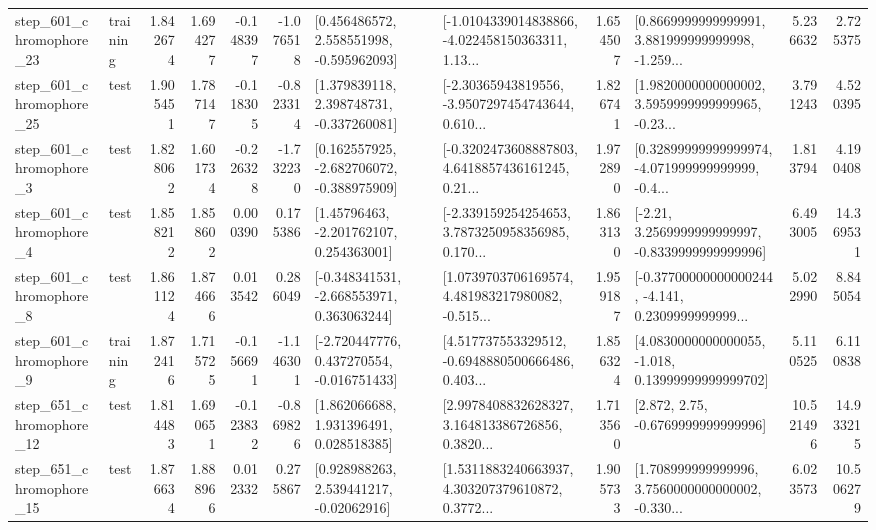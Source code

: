 \begin{tabular}{llrrrrllrlrr}
  step\_601\_chromophore\_23 &  training &      1.842674 &    1.694277 &     -0.148397 & -1.076518 &    [0.456486572, 2.558551998, -0.595962093] &  [-1.0104339014838866, -4.022458150363311, 1.13... &       1.654507 &  [0.8669999999999991, 3.881999999999998, -1.259... &            5.236632 &          2.725375 \\
  step\_601\_chromophore\_25 &      test &      1.905451 &    1.787147 &     -0.118305 & -0.823314 &    [1.379839118, 2.398748731, -0.337260081] &  [-2.30365943819556, -3.9507297454743644, 0.610... &       1.826741 &  [1.9820000000000002, 3.5959999999999965, -0.23... &            3.791243 &          4.520395 \\
   step\_601\_chromophore\_3 &      test &      1.828062 &    1.601734 &     -0.226328 & -1.732230 &   [0.162557925, -2.682706072, -0.388975909] &  [-0.3202473608887803, 4.6418857436161245, 0.21... &       1.972890 &  [0.32899999999999974, -4.071999999999999, -0.4... &            1.813794 &          4.190408 \\
   step\_601\_chromophore\_4 &      test &      1.858212 &    1.858602 &      0.000390 &  0.175386 &     [1.45796463, -2.201762107, 0.254363001] &  [-2.339159254254653, 3.7873250958356985, 0.170... &       1.863130 &   [-2.21, 3.2569999999999997, -0.8339999999999996] &            6.493005 &         14.369531 \\
   step\_601\_chromophore\_8 &      test &      1.861124 &    1.874666 &      0.013542 &  0.286049 &   [-0.348341531, -2.668553971, 0.363063244] &  [1.0739703706169574, 4.481983217980082, -0.515... &       1.959187 &  [-0.37700000000000244, -4.141, 0.2309999999999... &            5.022990 &          8.845054 \\
   step\_601\_chromophore\_9 &  training &      1.872416 &    1.715725 &     -0.156691 & -1.146301 &   [-2.720447776, 0.437270554, -0.016751433] &  [4.517737553329512, -0.6948880500666486, 0.403... &       1.856324 &  [4.0830000000000055, -1.018, 0.13999999999999702] &            5.110525 &          6.110838 \\
  step\_651\_chromophore\_12 &      test &      1.814483 &    1.690651 &     -0.123832 & -0.869826 &     [1.862066688, 1.931396491, 0.028518385] &  [2.9978408832628327, 3.164813386726856, 0.3820... &       1.713560 &                 [2.872, 2.75, -0.6769999999999996] &           10.521496 &         14.933215 \\
  step\_651\_chromophore\_15 &      test &      1.876634 &    1.888966 &      0.012332 &  0.275867 &     [0.928988263, 2.539441217, -0.02062916] &  [1.5311883240663937, 4.303207379610872, 0.3772... &       1.905733 &  [1.708999999999996, 3.7560000000000002, -0.330... &            6.023573 &         10.506279 \\

\end{tabular}
